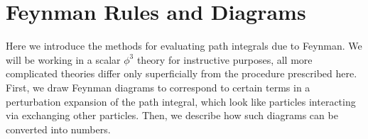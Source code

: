 \documentclass{book}
\begin{document}
\chapter{Feynman Rules and Diagrams}
Here we introduce the methods for evaluating path integrals due to Feynman. We will be working in a scalar $\phi^3$ theory for instructive purposes, all more complicated theories differ only superficially from the procedure prescribed here. First, we draw Feynman diagrams to correspond to certain terms in a perturbation expansion of the path integral, which look like particles interacting via exchanging other particles. Then, we describe how such diagrams can be converted into numbers.
\end{document}
